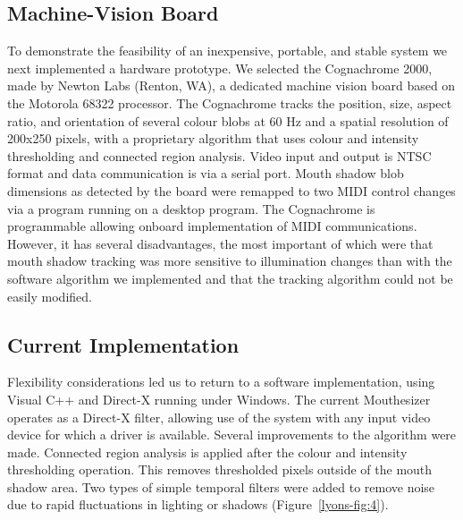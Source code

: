 \subsection{Machine-Vision Board}

To demonstrate the feasibility of an inexpensive, portable, and stable system we next implemented a hardware prototype. We selected the Cognachrome 2000, made by Newton Labs (Renton, WA), a dedicated machine vision board based on the Motorola 68322 processor. The Cognachrome tracks the position, size, aspect ratio, and orientation of several colour blobs at 60 Hz and a spatial resolution of 200x250 pixels, with a proprietary algorithm that uses colour and intensity thresholding and connected region analysis. Video input and output is NTSC format and data communication is via a serial port. Mouth shadow blob dimensions as detected by the board were remapped to two MIDI control changes via a program running on a desktop program. The Cognachrome is programmable allowing onboard implementation of MIDI communications. However, it has several disadvantages, the most important of which were that mouth shadow tracking was more sensitive to illumination changes than with the software algorithm we implemented and that the tracking algorithm could not be easily modified. 

\subsection{Current Implementation}

Flexibility considerations led us to return to a software implementation, using Visual C++ and Direct-X running under Windows. The current Mouthesizer operates as a Direct-X filter, allowing use of the system with any input video device for which a driver is available.
Several improvements to the algorithm were made. Connected region analysis is applied after the colour and intensity thresholding operation. This removes thresholded pixels outside of the mouth shadow area. Two types of simple temporal filters were added to remove noise due to rapid fluctuations in lighting or shadows (Figure~\ref{lyons-fig:4}).

